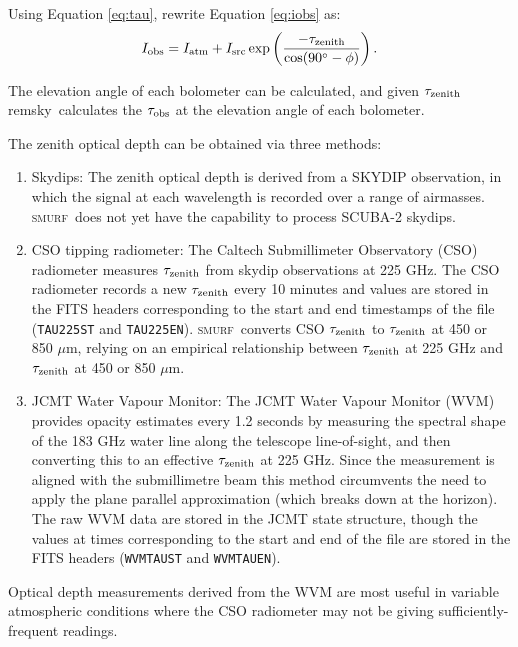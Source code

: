 \documentclass[twoside,11pt]{article}
\newcommand{\xref}[3]{#1}
\renewcommand{\_}{\texttt{\symbol{95}}}
\newcommand{\SMURF}{\textsc{smurf}}
\newcommand{\task}[1]{\textsf{#1}}
\newcommand{\remsky}{\xref{\task{remsky}}{sun258}{REMSKY}}
\begin{document}
Using Equation \ref{eq:tau}, rewrite Equation \ref{eq:iobs} as:
\begin{equation}
I_{\rm obs} = I_{\rm atm} + I_{\rm src} \exp \left(
\frac{-\tau_{\rm zenith}}{\cos(90^\circ-\phi)}\right).
\end{equation}

The elevation angle of each bolometer can be calculated, and given
$\tau_{\rm zenith}$ \remsky\ calculates the $\tau_{\rm obs}$ at the
elevation angle of each bolometer.

The zenith optical depth can be obtained via three methods:
\begin{enumerate}
\item Skydips: The zenith optical depth is derived from a SKYDIP
  observation, in which the signal at each wavelength is recorded over
  a range of airmasses. \SMURF\ does not yet have the capability to
  process SCUBA-2 skydips.

\item CSO tipping radiometer: The Caltech Submillimeter Observatory
  (CSO) radiometer measures $\tau_{\rm zenith}$ from skydip
  observations at 225 GHz. The CSO radiometer records a new $\tau_{\rm
    zenith}$ every 10 minutes and values are stored in the FITS
  headers corresponding to the start and end timestamps of the file
  (\texttt{TAU225ST} and \texttt{TAU225EN}). \SMURF\ converts CSO
  $\tau_{\rm zenith}$ to $\tau_{\rm zenith}$ at 450 or 850 $\mu$m,
  relying on an empirical relationship between $\tau_{\rm zenith}$ at
  225 GHz and $\tau_{\rm zenith}$ at 450 or 850 $\mu$m.

\item JCMT Water Vapour Monitor: The JCMT Water Vapour Monitor (WVM)
  provides opacity estimates every 1.2 seconds by measuring the
  spectral shape of the 183 GHz water line along the telescope
  line-of-sight, and then converting this to an effective $\tau_{\rm
    zenith}$ at 225 GHz. Since the measurement is aligned with the
  submillimetre beam this method circumvents the need to apply the
  plane parallel approximation (which breaks down at the horizon). The
  raw WVM data are stored in the JCMT state structure, though the
  values at times corresponding to the start and end of the file are
  stored in the FITS headers (\texttt{WVMTAUST} and
  \texttt{WVMTAUEN}).
\end{enumerate}
Optical depth measurements derived from the WVM are most useful in
variable atmospheric conditions where the CSO radiometer may not be
giving sufficiently-frequent readings.
\end{document}
